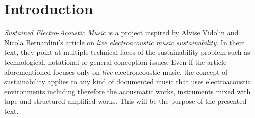 \documentclass[twoside,a4paper]{article}
\title{\papertitle}
\begin{document}
\maketitle


\begin{abstract}

The musical composition is close to a \emph{point break}: almost one hundred
years ago Ottorino Respighi introduced a recorded media into his orchestral
composition \emph{I Pini di Roma}  \cite{ropr25} and, even today, we don't have
a shared consolidate electroacoustic practice to play it likewise the orchestral
one. Someone does it better than others, by its equilibrium between knowledge
and consciousness. After all, it is only a recorded bird sound to be placed
inside an orchestra, not a virtuoso part to be played on a handmade custom
electroacoustic instrument disappeared from the earth except by memories and
score notes. The problem is more serious and profound if we consider that most
of today's electroacoustic manipulators don't know who Respighi was, what
happened after him and what are the differences between his pioneer usage of
recordings, instead of the later compositional purpose usage made by John Cage
\cite{cjil39}. Something must change to introduce a way that conducts a
consolidation practice on electroacoustic literature.

\end{abstract}


\section{Introduction}
\label{sec:intro}

\emph{Sustained Electro-Acoustic Music} is a project inspired by Alvise Vidolin
and Nicola Bernardini's article \cite{bevi05} on \emph{live electroacoustic music
sustainability}. In their text, they point at multiple technical faces of the
sustainability problem such as technological, notational or general conception
issues. Even if the article aforementioned focuses only on \emph{live}
electroacoustic music, the concept of sustainability applies to any kind of
documented music that uses electroacoustic environments including therefore the
acousmatic works, instruments mixed with tape and structured amplified works.
This will be the purpose of the presented text.
\end{document}
